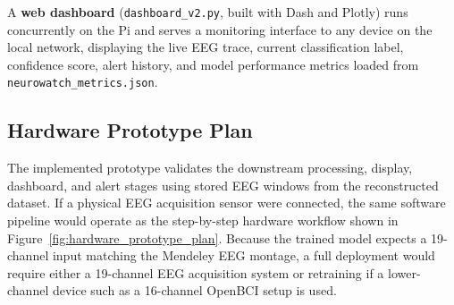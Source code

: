 \documentclass[12pt, a4paper]{report}
\begin{document}
A \textbf{web dashboard} (\texttt{dashboard\_v2.py}, built with Dash and
Plotly) runs concurrently on the Pi and serves a monitoring interface to
any device on the local network, displaying the live EEG trace, current
classification label, confidence score, alert history, and model
performance metrics loaded from \texttt{neurowatch\_metrics.json}.

\subsection{Hardware Prototype Plan}

The implemented prototype validates the downstream processing, display,
dashboard, and alert stages using stored EEG windows from the reconstructed
dataset. If a physical EEG acquisition sensor were connected, the same
software pipeline would operate as the step-by-step hardware workflow
shown in Figure~\ref{fig:hardware_prototype_plan}. Because the trained
model expects a 19-channel input matching the Mendeley EEG montage, a full
deployment would require either a 19-channel EEG acquisition system or
retraining if a lower-channel device such as a 16-channel OpenBCI setup is
used.
\end{document}
